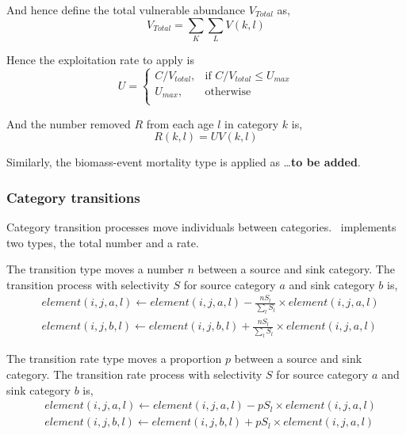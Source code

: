 And hence define the total vulnerable abundance $V_{Total}$ as,
\begin{equation}
  V_{Total}  = \sum\limits_K {\sum\limits_L {V(k,l)}} 
\end{equation}

Hence the exploitation rate to apply is 
\begin{equation}
U = \begin{cases}
  C/V_{total}, & \text{if $C/V_{total} \leq U_{max}$} \\
  U_{max}, & \text{otherwise}\\ 
  \end{cases} 
\end{equation}

And the number removed $R$ from each age $l$ in category $k$ is,
\begin{equation}
  R(k,l) = UV(k,l)
\end{equation}

Similarly, the biomass-event mortality type is applied as \ldots \textbf{to be added}.

\subsubsection{Category transitions}

Category transition processes move individuals between categories. \SPM\ implements two types, the total number and a rate. 

The transition type moves a number $n$ between a source and sink category. The transition process with selectivity $S$ for source category $a$ and sink category $b$ is,
\begin{equation}\begin{split}
  & element(i,j,a,l) \leftarrow element(i,j,a,l) - \frac{nS_l}{\sum\limits_l S_l} \times element(i,j,a,l) \\
  & element(i,j,b,l) \leftarrow element(i,j,b,l) + \frac{nS_l}{\sum\limits_l S_l} \times element(i,j,a,l)
\end{split}\end{equation}

The transition rate type moves a proportion $p$ between a source and sink category. The transition rate process with selectivity $S$ for source category $a$ and sink category $b$ is,
\begin{equation}\begin{split}
  & element(i,j,a,l) \leftarrow element(i,j,a,l) - pS_l \times element(i,j,a,l) \\
  & element(i,j,b,l) \leftarrow element(i,j,b,l) + pS_l \times element(i,j,a,l)
\end{split}\end{equation}

